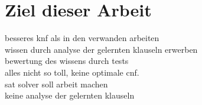 \section{Ziel dieser Arbeit}

besseres knf als in den verwanden arbeiten\\
wissen durch analyse der gelernten klauseln erwerben\\
bewertung des wissens durch tests\\

alles nicht so toll, keine optimale cnf.\\
sat solver soll arbeit machen\\
keine analyse der gelernten klauseln

